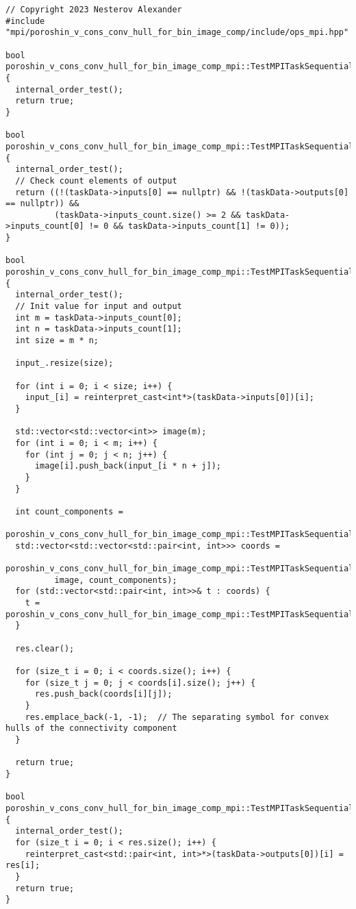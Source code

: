 \documentclass[12pt]{article}
\begin{document}
\begin{verbatim}
// Copyright 2023 Nesterov Alexander
#include "mpi/poroshin_v_cons_conv_hull_for_bin_image_comp/include/ops_mpi.hpp"

bool poroshin_v_cons_conv_hull_for_bin_image_comp_mpi::TestMPITaskSequential::pre_processing() {
  internal_order_test();
  return true;
}

bool poroshin_v_cons_conv_hull_for_bin_image_comp_mpi::TestMPITaskSequential::validation() {
  internal_order_test();
  // Check count elements of output
  return ((!(taskData->inputs[0] == nullptr) && !(taskData->outputs[0] == nullptr)) &&
          (taskData->inputs_count.size() >= 2 && taskData->inputs_count[0] != 0 && taskData->inputs_count[1] != 0));
}

bool poroshin_v_cons_conv_hull_for_bin_image_comp_mpi::TestMPITaskSequential::run() {
  internal_order_test();
  // Init value for input and output
  int m = taskData->inputs_count[0];
  int n = taskData->inputs_count[1];
  int size = m * n;

  input_.resize(size);

  for (int i = 0; i < size; i++) {
    input_[i] = reinterpret_cast<int*>(taskData->inputs[0])[i];
  }

  std::vector<std::vector<int>> image(m);
  for (int i = 0; i < m; i++) {
    for (int j = 0; j < n; j++) {
      image[i].push_back(input_[i * n + j]);
    }
  }

  int count_components =
      poroshin_v_cons_conv_hull_for_bin_image_comp_mpi::TestMPITaskSequential::label_connected_components(image);
  std::vector<std::vector<std::pair<int, int>>> coords =
      poroshin_v_cons_conv_hull_for_bin_image_comp_mpi::TestMPITaskSequential::coordinates_connected_components(
          image, count_components);
  for (std::vector<std::pair<int, int>>& t : coords) {
    t = poroshin_v_cons_conv_hull_for_bin_image_comp_mpi::TestMPITaskSequential::convex_hull(t);
  }

  res.clear();

  for (size_t i = 0; i < coords.size(); i++) {
    for (size_t j = 0; j < coords[i].size(); j++) {
      res.push_back(coords[i][j]);
    }
    res.emplace_back(-1, -1);  // The separating symbol for convex hulls of the connectivity component
  }

  return true;
}

bool poroshin_v_cons_conv_hull_for_bin_image_comp_mpi::TestMPITaskSequential::post_processing() {
  internal_order_test();
  for (size_t i = 0; i < res.size(); i++) {
    reinterpret_cast<std::pair<int, int>*>(taskData->outputs[0])[i] = res[i];
  }
  return true;
}


\end{verbatim}
\end{document}
